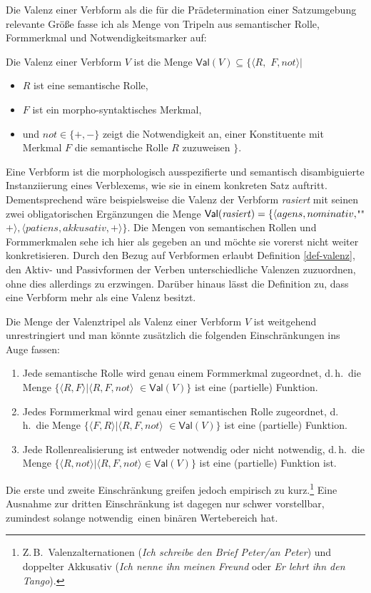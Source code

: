 Die Valenz einer Verbform als die für die Prädetermination einer Satzumgebung relevante Grö\ss e fasse ich als Menge von Tripeln aus semantischer Rolle, Formmerkmal und Notwendigkeitsmarker auf:
\begin{definition}[Valenz] \label{def-valenz}
Die Valenz einer Verbform $V$ ist die Menge $\mathsf{Val}(V) \subseteq \{ \langle R,$ $F, not \rangle |$ 
\begin{itemize}
	\item $R$ ist eine semantische Rolle, 
	\item $F$ ist ein morpho-syntaktisches Merkmal,
	\item und $not \in \{+,-\}$ zeigt die Notwendigkeit an, einer Konstituente mit Merkmal $F$ die semantische Rolle $R$ zuzuwei\-sen $\}$.
\end{itemize} 
\end{definition}
Eine Verbform ist die morphologisch ausspezifierte und semantisch disambiguierte Instanziierung eines Verblexems, wie sie in einem konkreten Satz auftritt. Dementsprechend wäre beispielsweise die Valenz der Verbform \textit{rasiert} mit seinen zwei obligatorischen Ergänzungen die Menge $\mathsf{Val}(\text{\textit{rasiert}}) = \{\langle agens, nominativ, $""$+\rangle, \langle patiens, akkusativ, +\rangle\}$. Die Mengen von semantischen Rollen und Formmerkmalen sehe ich hier als gegeben an und möchte sie vorerst nicht weiter konkretisieren. Durch den Bezug auf Verbformen erlaubt Definition \ref{def-valenz}, den Aktiv- und Passivformen der Verben unterschiedliche Valenzen zuzuordnen, ohne dies allerdings zu erzwingen. Darüber hinaus lässt die Definition zu, dass eine Verbform mehr als eine Valenz besitzt. 

Die Menge der Valenztripel als Valenz einer Verbform $V$ ist weitgehend unrestringiert und man könnte zusätzlich die folgenden Einschränkungen ins Auge fassen: 
\begin{enumerate}\setlength{\itemsep}{-.5ex}
  \item Jede semantische Rolle wird genau einem Formmerkmal zugeordnet, d.\,h.\ die Menge $\{\langle R,F \rangle | \langle R,F,not \rangle$ $\in \mathsf{Val}(V) \}$ ist eine (partielle) Funktion.
  \item Jedes Formmerkmal wird genau einer semantischen Rolle zugeordnet, d.\,h.\ die Menge $\{\langle F,R \rangle | \langle R,F,not \rangle$ $\in \mathsf{Val}(V) \}$ ist eine (partielle) Funktion.
  \item Jede Rollenrealisierung ist entweder notwendig oder nicht notwendig, d.\,h.\ die Menge $\{\langle R, not \rangle | \langle R,F,not \rangle \in \mathsf{Val}(V) \}$ ist eine (partielle) Funktion ist.
\end{enumerate}
Die erste und zweite Einschränkung greifen jedoch empirisch zu kurz.\footnote{Z.\,B.\ Valenzalternationen (\textit{Ich schreibe den Brief Peter/an Peter}) und doppelter Akkusativ (\textit{Ich nenne ihn meinen Freund} oder \textit{Er lehrt ihn den Tango}).} Eine Ausnahme zur dritten Einschränkung ist dagegen nur schwer vorstellbar, zumindest solange \glq notwendig\grq\ einen binären Wertebereich hat. 

